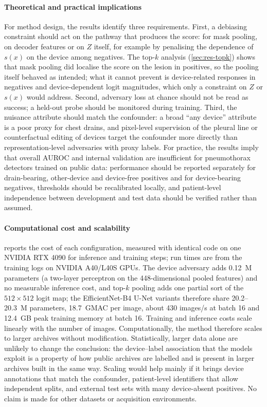 \documentclass{ieeeaccess}
\begin{document}
\paragraph{Theoretical and practical implications}
For method design, the results identify three requirements. First, a debiasing constraint should act on the pathway that produces the score: for mask pooling, on decoder features or on $Z$ itself, for example by penalising the dependence of $s(x)$ on the device among negatives. The top-$k$ analysis (\cref{sec:res-topk}) shows that mask pooling did localise the score on the lesion in positives, so the pooling itself behaved as intended; what it cannot prevent is device-related responses in negatives and device-dependent logit magnitudes, which only a constraint on $Z$ or $s(x)$ would address. Second, adversary loss at chance should not be read as success; a held-out probe should be monitored during training. Third, the nuisance attribute should match the confounder: a broad ``any device'' attribute is a poor proxy for chest drains, and pixel-level supervision of the pleural line \cite{rueckel2021annotations} or counterfactual editing of devices \cite{cooke2026roentmod} target the confounder more directly than representation-level adversaries with proxy labels. For practice, the results imply that overall AUROC and internal validation are insufficient for pneumothorax detectors trained on public data: performance should be reported separately for drain-bearing, other-device and device-free positives and for device-bearing negatives, thresholds should be recalibrated locally, and patient-level independence between development and test data should be verified rather than assumed.

\paragraph{Computational cost and scalability}
 reports the cost of each configuration, measured with identical code on one NVIDIA RTX 4090 for inference and training steps; run times are from the training logs on NVIDIA A40/L40S GPUs. The device adversary adds 0.12~M parameters (a two-layer perceptron on the 448-dimensional pooled features) and no measurable inference cost, and top-$k$ pooling adds one partial sort of the $512\times512$ logit map; the EfficientNet-B4 U-Net variants therefore share 20.2--20.3~M parameters, 18.7~GMAC per image, about 430 images/s at batch 16 and 12.4~GB peak training memory at batch 16. Training and inference costs scale linearly with the number of images. Computationally, the method therefore scales to larger archives without modification. Statistically, larger data alone are unlikely to change the conclusion: the device--label association that the models exploit is a property of how public archives are labelled and is present in larger archives built in the same way. Scaling would help mainly if it brings device annotations that match the confounder, patient-level identifiers that allow independent splits, and external test sets with many device-absent positives. No claim is made for other datasets or acquisition environments.
\end{document}
